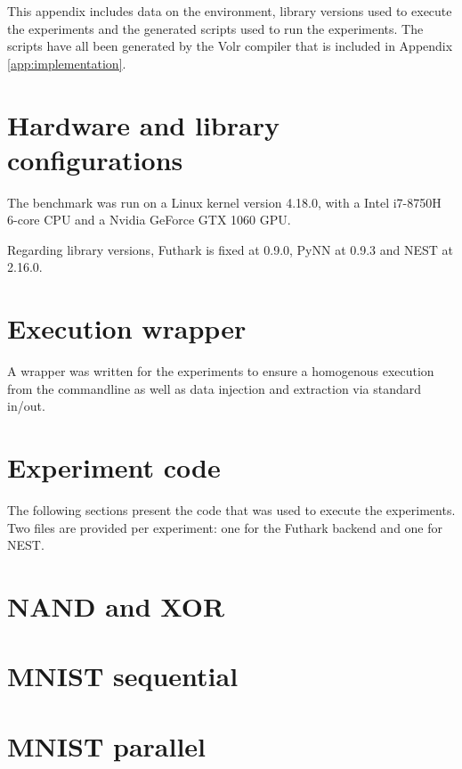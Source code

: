 This appendix includes data on the environment, library versions used to
execute the experiments and the generated scripts used to run the experiments.
The scripts have all been generated by the Volr compiler that is included in Appendix
\ref{app:implementation}.

\section{Hardware and library configurations}
The benchmark was run on a Linux kernel version 4.18.0, with a Intel i7-8750H
6-core CPU and a Nvidia GeForce GTX 1060 GPU.

Regarding library versions, Futhark is fixed at 0.9.0, PyNN at 0.9.3 and NEST at 2.16.0.

\section{Execution wrapper}

A wrapper was written for the experiments to ensure a homogenous execution from
the commandline as well as data injection and extraction via standard in/out.



\section{Experiment code}

The following sections present the code that was used to execute the
experiments. 
Two files are provided per experiment: one for the Futhark backend and one for
NEST.

\section{NAND and XOR}




\section{MNIST sequential}




\section{MNIST parallel}

